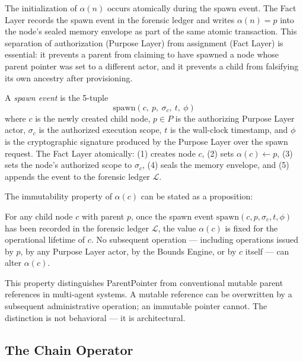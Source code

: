 The initialization of $\alpha(n)$ occurs atomically during the spawn event. The Fact Layer records the spawn event in the forensic ledger and writes $\alpha(n) = p$ into the node's sealed memory envelope as part of the same atomic transaction. This separation of authorization (Purpose Layer) from assignment (Fact Layer) is essential: it prevents a parent from claiming to have spawned a node whose parent pointer was set to a different actor, and it prevents a child from falsifying its own ancestry after provisioning.

\begin{dfn}\label{dfn:spawn-event}
A \emph{spawn event} is the 5-tuple
\begin{equation}
\mathrm{spawn}(c,\ p,\ \sigma_c,\ t,\ \phi)
\end{equation}
where $c$ is the newly created child node, $p \in P$ is the authorizing Purpose Layer actor, $\sigma_c$ is the authorized execution scope, $t$ is the wall-clock timestamp, and $\phi$ is the cryptographic signature produced by the Purpose Layer over the spawn request. The Fact Layer atomically: (1) creates node $c$, (2) sets $\alpha(c) \leftarrow p$, (3) sets the node's authorized scope to $\sigma_c$, (4) seals the memory envelope, and (5) appends the event to the forensic ledger $\mathcal{L}$.
\end{dfn}

The immutability property of $\alpha(c)$ can be stated as a proposition:

\begin{prop}\label{prop:parent-pointer-immutable}
For any child node $c$ with parent $p$, once the spawn event $\mathrm{spawn}(c, p, \sigma_c, t, \phi)$ has been recorded in the forensic ledger $\mathcal{L}$, the value $\alpha(c)$ is fixed for the operational lifetime of $c$. No subsequent operation — including operations issued by $p$, by any Purpose Layer actor, by the Bounds Engine, or by $c$ itself — can alter $\alpha(c)$.
\end{prop}

This property distinguishes ParentPointer from conventional mutable parent references in multi-agent systems. A mutable reference can be overwritten by a subsequent administrative operation; an immutable pointer cannot. The distinction is not behavioral — it is architectural.

\subsection{The Chain Operator}
\label{sec:chain-operator}

